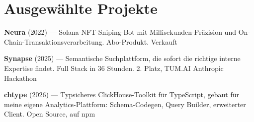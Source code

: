 \documentclass[a4paper,10pt]{article}
\begin{document}
\section{Ausgew\"ahlte Projekte}
\textbf{Neura} {\small(2022)} ---
Solana-NFT-Sniping-Bot mit Millisekunden-Pr\"azision und On-Chain-Transaktionsverarbeitung. Abo-Produkt. Verkauft

\vspace{2pt}
\textbf{Synapse} {\small(2025)} ---
Semantische Suchplattform, die sofort die richtige interne Expertise findet. Full Stack in 36 Stunden. 2. Platz, TUM.AI \texttimes{} Anthropic Hackathon

\vspace{2pt}
\textbf{chtype} {\small(2026)} ---
Typsicheres ClickHouse-Toolkit f\"ur TypeScript, gebaut f\"ur meine eigene Analytics-Plattform: Schema-Codegen, Query Builder, erweiterter Client. Open Source, auf npm
\end{document}
